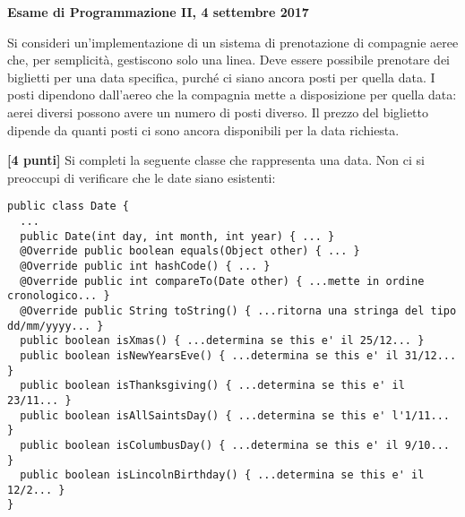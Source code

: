 \documentclass{article}[10pt]
\newcounter{esnu}
\newenvironment{esercizio}{\medskip \noindent {\bf Esercizio\addtocounter{esnu}{1} \arabic{esnu}}}{}
\begin{document}
\begin{center} {\bf Esame di Programmazione II, 4 settembre 2017}\end{center}

Si consideri un'implementazione di un sistema di prenotazione di compagnie aeree
che, per semplicit\`a, gestiscono solo una linea. Deve essere possibile prenotare
dei biglietti per una data specifica, purch\'e ci siano ancora posti per quella data.
I posti dipendono dall'aereo che la compagnia mette a disposizione per quella data:
aerei diversi possono avere un numero di posti diverso. Il prezzo del biglietto
dipende da quanti posti ci sono ancora disponibili per la data richiesta.

\begin{esercizio}
\textbf{[4 punti]}
Si completi la seguente classe che rappresenta una data. Non ci si preoccupi di verificare che le date siano esistenti:
%
{\small\begin{verbatim}
public class Date {
  ...
  public Date(int day, int month, int year) { ... }
  @Override public boolean equals(Object other) { ... }
  @Override public int hashCode() { ... }
  @Override public int compareTo(Date other) { ...mette in ordine cronologico... }
  @Override public String toString() { ...ritorna una stringa del tipo dd/mm/yyyy... }
  public boolean isXmas() { ...determina se this e' il 25/12... }
  public boolean isNewYearsEve() { ...determina se this e' il 31/12... }
  public boolean isThanksgiving() { ...determina se this e' il 23/11... }
  public boolean isAllSaintsDay() { ...determina se this e' l'1/11... }
  public boolean isColumbusDay() { ...determina se this e' il 9/10... }
  public boolean isLincolnBirthday() { ...determina se this e' il 12/2... }
}
\end{verbatim}}
%
\end{esercizio}
\end{document}
